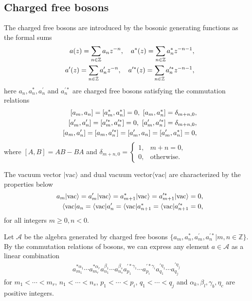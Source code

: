 \documentclass[11pt,reqno]{amsart}
\numberwithin{equation}{section}
\begin{document}
\subsection{Charged free bosons}
The charged free bosons are introduced by the bosonic generating functions as the formal sums
\begin{eqnarray}\label{boson_generating_function}
&&a(z)=\sum\limits_{n\in\mathbb{Z}}a_{n}z^{-n},\quad a^{\ast}(z)=\sum\limits_{n\in\mathbb{Z}}a^{\ast}_{n}z^{-n-1},\notag\\
&&a^{\prime}(z)=\sum\limits_{n\in\mathbb{Z}}a^{\prime}_{n}z^{-n},\quad a^{\prime\ast}(z)=\sum\limits_{n\in\mathbb{Z}}a^{\prime\ast}_{n}z^{-n-1},
\end{eqnarray}
here $a_{n},a^{\ast}_{n},a^{\prime}_{n}$ and $a^{\prime\ast}_{n}$ are charged free bosons satisfying the  commutation relations
\begin{eqnarray}\label{boson_commutation}
&&[a_{m},a_{n}]=[a^{\ast}_{m},a^{\ast}_{n}]=0,\ [a_{m},a^{\ast}_{n}]=\delta_{m+n,0},\notag\\
&&[a^{\prime}_{m},a^{\prime}_{n}]=[a^{\prime\ast}_{m},a^{\prime\ast}_{n}]=0,\ [a^{\prime}_{m},a^{\prime\ast}_{n}]=\delta_{m+n,0},\notag\\
&&[a_{m},a^{\prime}_{n}]=[a_{m},a^{\prime\ast}_{n}]=[a^{\prime}_{m},a_{n}]
=[a^{\prime}_{m},a^{\ast}_{n}]=0,
\end{eqnarray}
where $[A,B]=AB-BA$ and $\delta_{m+n,0} = \begin{cases}
1, &m+n=0, \\
0, & \text{otherwise}.
\end{cases}$

The vacuum vector $|\text{vac}\rangle$ and  dual vacuum vector$\langle \text{vac}|$   are characterized by the properties below
\begin{eqnarray}\label{boson annihilation relations}
&&a_{m}|\text{vac}\rangle=a^{\prime}_{m}|\text{vac}\rangle
=a^{\ast}_{m+1}|\text{vac}\rangle=a^{\prime\ast}_{m+1}|\text{vac}\rangle=0,\notag\\
&&\langle\text{vac}|a_{n}=\langle\text{vac}|a^{\prime}_{n}
=\langle\text{vac}|a^{\ast}_{n+1}=\langle\text{vac}|a^{\prime\ast}_{n+1}=0,
\end{eqnarray}
for all integers $m\geq0, n<0$.




Let $\mathcal{A}$ be the algebra generated by charged free bosons $\{a_{m},a^{\ast}_{n},a^{\prime}_{m},a^{\prime\ast}_{n}|m,n\in\mathbb{Z}\}$. By the commutation relations of bosons, we can express any element $a\in\mathcal{A}$ as a linear combination
\begin{eqnarray}
a^{\ast\alpha_{1}}_{m_{1}}\cdots a^{\ast\alpha_{r}}_{m_{r}}a^{\beta_{1}}_{n_{1}}\cdots a^{\beta_{s}}_{n_{s}}a^{\prime\ast\gamma_{1}}_{p_{1}}\cdots a^{\prime\ast\gamma_{i}}_{p_{i}}a^{\prime\eta_{1}}_{q_{1}}\cdots a^{\prime\eta_{j}}_{q_{j}}
\end{eqnarray}
for $m_{1}<\cdots<m_{r}$, $n_{1}<\cdots<n_{s}$, $p_{1}<\cdots<p_{i}$, $q_{1}<\cdots<q_{j}$ and $\alpha_{k},\beta_{l},\gamma_{b},\eta_{c}$ are positive integers.
\end{document}
